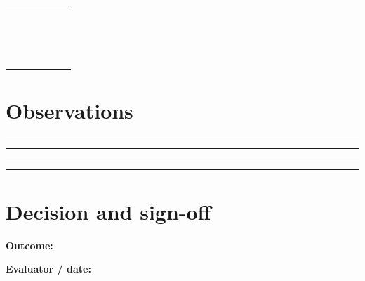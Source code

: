 \documentclass[10pt,letterpaper]{article}
\begin{document}
\begin{longtable}{|p{0.156\linewidth}|p{0.156\linewidth}|p{0.156\linewidth}|p{0.156\linewidth}|p{0.156\linewidth}|}
\rule{0pt}{20pt} &  &  &  & \\\hline
\rule{0pt}{20pt} &  &  &  & \\\hline
\rule{0pt}{20pt} &  &  &  & \\\hline
\rule{0pt}{20pt} &  &  &  & \\\hline
\rule{0pt}{20pt} &  &  &  & \\\hline
\rule{0pt}{20pt} &  &  &  & \\\hline
\rule{0pt}{20pt} &  &  &  & \\\hline
\rule{0pt}{20pt} &  &  &  & \\\hline
\rule{0pt}{20pt} &  &  &  & \\\hline
\rule{0pt}{20pt} &  &  &  & \\\hline
\rule{0pt}{20pt} &  &  &  & \\\hline
\rule{0pt}{20pt} &  &  &  & \\\hline
\rule{0pt}{20pt} &  &  &  & \\\hline
\rule{0pt}{20pt} &  &  &  & \\\hline
\rule{0pt}{20pt} &  &  &  & \\\hline
\rule{0pt}{20pt} &  &  &  & \\\hline
\rule{0pt}{20pt} &  &  &  & \\\hline
\rule{0pt}{20pt} &  &  &  & \\\hline
\end{longtable}
\section{Observations}
\noindent\rule{\linewidth}{0.4pt}\par\vspace{18pt}\noindent\rule{\linewidth}{0.4pt}\par\vspace{18pt}\noindent\rule{\linewidth}{0.4pt}\par\vspace{18pt}\noindent\rule{\linewidth}{0.4pt}\par\vspace{18pt}\section{Decision and sign-off}
\noindent\textbf{Outcome:}\quad\hrulefill\par\vspace{16pt}\noindent\textbf{Evaluator / date:}\quad\hrulefill\par
\end{document}
